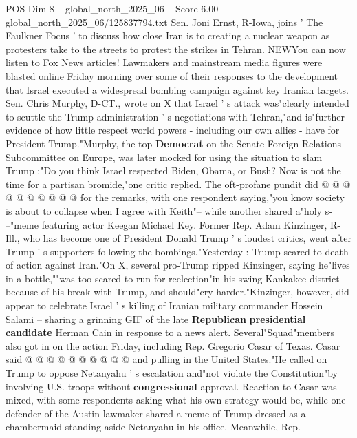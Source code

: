 \begin{textsample}{POS Dim 8 – global\_north\_2025\_06 – Score 6.00 – global\_north\_2025\_06/125837794.txt}  \label{ex:f8_pos_434}
Sen.
Joni Ernst, R-Iowa, joins ' The Faulkner Focus ' to discuss how close Iran is to creating a nuclear weapon as protesters take to the streets to protest the strikes in Tehran.
NEWYou can now listen to Fox News articles!
Lawmakers and mainstream media figures were blasted online Friday morning over some of their responses to the development that Israel executed a widespread bombing campaign against key Iranian targets.
Sen.
Chris Murphy, D-CT., wrote on X that Israel ' s attack was"clearly intended to scuttle the Trump administration ' s negotiations with Tehran,"and is"further evidence of how little respect world powers - including our own allies - have for President Trump."Murphy, the top \textbf{Democrat} on the Senate Foreign Relations Subcommittee on Europe, was later mocked for using the situation to slam Trump :"Do you think Israel respected Biden, Obama, or Bush?
Now is not the time for a partisan bromide,"one critic replied.
The oft-profane pundit did @ @ @ @ @ @ @ @ @ @ for the remarks, with one respondent saying,"you know society is about to collapse when I agree with Keith"-- while another shared a"holy s- --"meme featuring actor Keegan Michael Key.
Former Rep.
Adam Kinzinger, R-Ill., who has become one of President Donald Trump ' s loudest critics, went after Trump ' s supporters following the bombings."Yesterday : Trump scared to death of action against Iran."On X, several pro-Trump ripped Kinzinger, saying he"lives in a bottle,""was too scared to run for reelection"in his swing Kankakee district because of his break with Trump, and should"cry harder."Kinzinger, however, did appear to celebrate Israel ' s killing of Iranian military commander Hossein Salami -- sharing a grinning GIF of the late \textbf{Republican} \textbf{presidential} \textbf{candidate} Herman Cain in response to a news alert.
Several"Squad"members also got in on the action Friday, including Rep.
Gregorio Casar of Texas.
Casar said @ @ @ @ @ @ @ @ @ @ and pulling in the United States."He called on Trump to oppose Netanyahu ' s escalation and"not violate the Constitution"by involving U.S. troops without \textbf{congressional} approval.
Reaction to Casar was mixed, with some respondents asking what his own strategy would be, while one defender of the Austin lawmaker shared a meme of Trump dressed as a chambermaid standing aside Netanyahu in his office.
Meanwhile, Rep.

\end{textsample}

